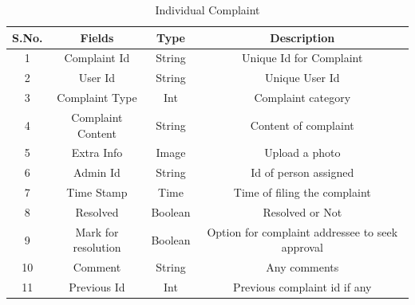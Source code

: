 \documentclass{article}
\begin{document}
\begin{table}[!htb]
\centering
\caption{Individual Complaint}
\label{my-label}
\begin{tabular}{|c|c|c|c|}
\hline
\textbf{S.No.} & \textbf{Fields}     & \textbf{Type} & \textbf{Description}                            \\ \hline
1              & Complaint Id        & String        & Unique Id for Complaint                         \\ \hline
2              & User Id             & String        & Unique User Id                                  \\ \hline
3              & Complaint Type      & Int           & Complaint category                              \\ \hline
4              & Complaint Content   & String        & Content of complaint                            \\ \hline
5              & Extra Info          & Image         & Upload a photo                                  \\ \hline
6              & Admin Id            & String        & Id of person assigned                           \\ \hline
7              & Time Stamp          & Time          & Time of filing the complaint                    \\ \hline
8              & Resolved            & Boolean       & Resolved or Not                                 \\ \hline
9              & Mark for resolution & Boolean       & Option for complaint addressee to seek approval \\ \hline
10             & Comment             & String        & Any comments                                    \\ \hline
11             & Previous Id         & Int           & Previous complaint id if any                    \\ \hline
\end{tabular}
\end{table}
\end{document}

